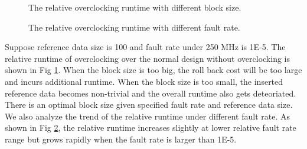 \begin{figure}
    \caption{The relative overclocking runtime with different block size.}
\label{fig:cost_block}
\vspace{-1em}
\end{figure}

\begin{figure}
    \caption{The relative overclocking runtime with different fault rate.}
\label{fig:cost_probability}
\vspace{-1em}
\end{figure}


Suppose reference data size is 100 and fault rate under 250 MHz is 1E-5. The relative runtime 
of overclocking over the normal design without overclocking is shown 
in Fig \ref{fig:cost_block}. When the block size is too big, the roll back cost will be 
too large and incurs additional runtime. When the block size is too small, the inserted 
reference data becomes non-trivial and the overall runtime also gets deteoriated. There is 
an optimal block size given specified fault rate and reference data size.
We also analyze the trend of the relative runtime under different fault rate.
As shown in Fig \ref{fig:cost_probability}, the relative runtime increases slightly at 
lower relative fault rate range but grows rapidly when the fault rate is larger than 1E-5.


